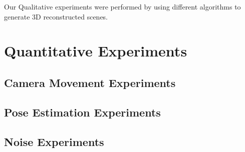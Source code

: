 Our Qualitative experiments were performed by using different algorithms to generate 3D reconstructed scenes. 

\section{Quantitative Experiments}

\subsection{Camera Movement Experiments}

\subsection{Pose Estimation Experiments}

\subsection{Noise Experiments}




